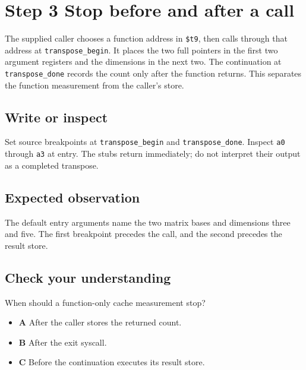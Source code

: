 \section{Step 3 Stop before and after a call}\label{transpose-s03}

The supplied caller chooses a function address in \texttt{\$t9}, then calls through that address at \texttt{transpose\_begin}. It places the two full pointers in the first two argument registers and the dimensions in the next two. The continuation at \texttt{transpose\_done} records the count only after the function returns. This separates the function measurement from the caller's store.

\subsection{Write or inspect}
Set source breakpoints at \texttt{transpose\_begin} and \texttt{transpose\_done}. Inspect \texttt{a0} through \texttt{a3} at entry. The stubs return immediately; do not interpret their output as a completed transpose.

\subsection{Expected observation}
The default entry arguments name the two matrix bases and dimensions three and five. The first breakpoint precedes the call, and the second precedes the result store.

\subsection{Check your understanding}
When should a function-only cache measurement stop?

\begin{itemize}
  \item \textbf{A} After the caller stores the returned count.
  \item \textbf{B} After the exit syscall.
  \item \textbf{C} Before the continuation executes its result store.
\end{itemize}
